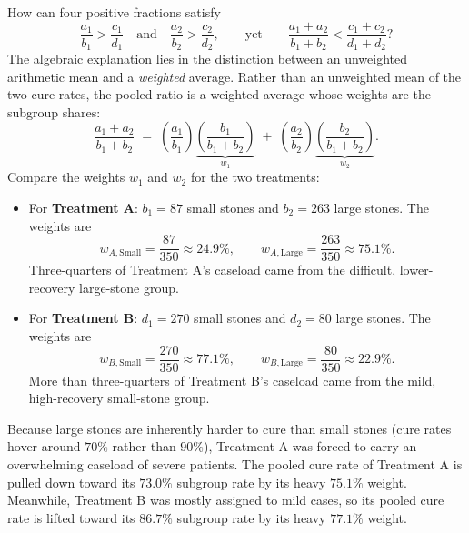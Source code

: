 How can four positive fractions satisfy
\[
  \frac{a_1}{b_1} > \frac{c_1}{d_1} \quad\text{and}\quad \frac{a_2}{b_2} > \frac{c_2}{d_2},
  \qquad\text{yet}\qquad
  \frac{a_1 + a_2}{b_1 + b_2} < \frac{c_1 + c_2}{d_1 + d_2}?
\]
The algebraic explanation lies in the distinction between an unweighted arithmetic mean and a \emph{weighted} average. Rather than an unweighted mean of the two cure rates, the pooled ratio is a weighted average whose weights are the subgroup shares:
\begin{equation}
\label{ch15:eq-weighted-pooled}
  \frac{a_1 + a_2}{b_1 + b_2}
  \;=\; \left(\frac{a_1}{b_1}\right) \underbrace{\left(\frac{b_1}{b_1 + b_2}\right)}_{w_1}
  \;+\; \left(\frac{a_2}{b_2}\right) \underbrace{\left(\frac{b_2}{b_1 + b_2}\right)}_{w_2}.
\end{equation}
Compare the weights $w_1$ and $w_2$ for the two treatments:
\begin{itemize}
  \item For \textbf{Treatment A}: $b_1 = 87$ small stones and $b_2 = 263$ large stones. The weights are
  \[
    w_{A,\text{Small}} = \frac{87}{350} \approx 24.9\%, \qquad
    w_{A,\text{Large}} = \frac{263}{350} \approx 75.1\%.
  \]
  Three-quarters of Treatment A's caseload came from the difficult, lower-recovery large-stone group.
  \item For \textbf{Treatment B}: $d_1 = 270$ small stones and $d_2 = 80$ large stones. The weights are
  \[
    w_{B,\text{Small}} = \frac{270}{350} \approx 77.1\%, \qquad
    w_{B,\text{Large}} = \frac{80}{350} \approx 22.9\%.
  \]
  More than three-quarters of Treatment B's caseload came from the mild, high-recovery small-stone group.
\end{itemize}

Because large stones are inherently harder to cure than small stones (cure rates hover around $70\%$ rather than $90\%$), Treatment A was forced to carry an overwhelming caseload of severe patients. The pooled cure rate of Treatment A is pulled down toward its $73.0\%$ subgroup rate by its heavy $75.1\%$ weight. Meanwhile, Treatment B was mostly assigned to mild cases, so its pooled cure rate is lifted toward its $86.7\%$ subgroup rate by its heavy $77.1\%$ weight.

